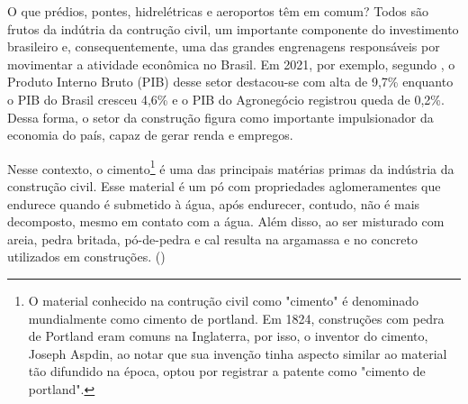 


\label{cap:introducao}

\enlargethispage{.5\baselineskip}

O que prédios, pontes, hidrelétricas e aeroportos têm em 
comum? Todos são frutos da indútria da contrução civil, 
um importante componente do investimento brasileiro e, 
consequentemente, uma das grandes engrenagens responsáveis 
por movimentar a atividade econômica no Brasil. Em 2021, 
por exemplo, segundo \cite{cbic-report}, o Produto Interno Bruto (PIB) desse setor 
destacou-se com alta de 9,7\% enquanto o PIB do Brasil cresceu 
4,6\% e o PIB do Agronegócio registrou queda de 0,2\%. Dessa 
forma, o setor da construção figura como importante 
impulsionador da economia do país, capaz de gerar renda e 
empregos. 

Nesse contexto, o cimento\footnote{O material conhecido na contrução 
civil como "cimento" é denominado mundialmente como cimento de 
portland. Em 1824, construções com pedra de Portland eram 
comuns na Inglaterra, por isso, o inventor do cimento, Joseph
Aspdin, ao notar que sua invenção tinha aspecto similar ao 
material tão difundido na época, optou por registrar a patente
como "cimento de portland".} é uma das principais matérias
primas da indústria da construção civil. Esse material é 
um pó com propriedades aglomeramentes que endurece quando é 
submetido à água, após endurecer, contudo, não é 
mais decomposto, mesmo em contato com a água. Além disso,
ao ser misturado com areia, pedra 
britada, pó-de-pedra e cal resulta na argamassa e no 
concreto utilizados em construções. (\cite{boletim-cimento})

